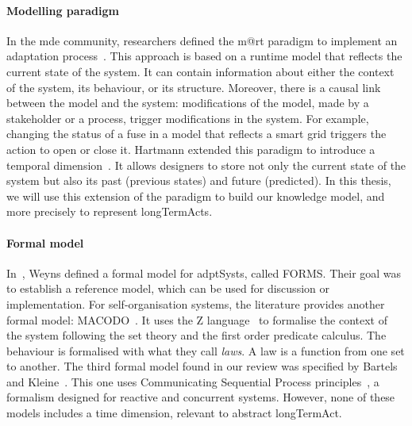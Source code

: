 \paragraph{Modelling paradigm}
In the \gls{mde} community, researchers defined the \gls{m@rt} paradigm to implement an adaptation process~\cite{DBLP:journals/computer/BlairBF09, DBLP:journals/computer/MorinBJFS09}.
This approach is based on a runtime model that reflects the current state of the system.
It can contain information about either the \gls{context} of the system, its \gls{behaviour}, or its \gls{structure}.
Moreover, there is a causal link between the model and the system: modifications of the model, made by a stakeholder or a process, trigger modifications in the system.
For example, changing the status of a fuse in a model that reflects a smart grid triggers the action to open or close it.
Hartmann \etal extended this paradigm to introduce a temporal dimension~\cite{DBLP:conf/seke/0001FNMKT14, DBLP:conf/models/0001FNMKBT14}.
It allows designers to store not only the current state of the system but also its past (previous states) and future (predicted).
In this thesis, we will use this extension of the paradigm to build our knowledge model, and more precisely to represent \glspl{longTermAct}.

\paragraph{Formal model}
In~\cite{DBLP:journals/taas/WeynsMA12}, Weyns \etal defined a formal model for \glspl{adptSyst}, called FORMS.
Their goal was to establish a reference model, which can be used for discussion or implementation.
For self-organisation systems, the literature provides another formal model: MACODO~\cite{DBLP:journals/taas/WeynsHH10}.
It uses the Z language~\cite{DBLP:books/daglib/0011651} to formalise the context of the system following the set theory and the first order predicate calculus.
The \gls{behaviour} is formalised with what they call \textit{laws}.
A law is a function from one set to another.
The third formal model found in our review was specified by Bartels and Kleine~\cite{DBLP:conf/icse/BartelsK11}.
This one uses Communicating Sequential Process principles~\cite{DBLP:journals/cacm/Hoare78}, a formalism designed for reactive and concurrent systems.
However, none of these models includes a time dimension, relevant to abstract \gls{longTermAct}.

